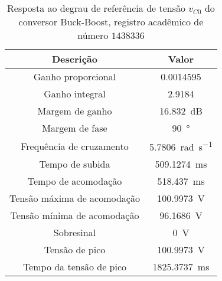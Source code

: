 \begin{table}[!ht]
\centering
\caption{Resposta ao degrau de referência de tensão $v_{C0}$ do conversor Buck-Boost, registro acadêmico de número $1438336$}
\label{tab:resposta1malha}
\begin{tabular}{@{}cc@{}}
\toprule
\textbf{Descrição} & \textbf{Valor}\\ \midrule
Ganho proporcional & \SI{0.0014595}{}\\
Ganho integral & \SI{2.9184}{}\\
Margem de ganho & \SI{16.832}{\deci\bel}\\
Margem de fase & \SI{90}{\degree}\\
Frequência de cruzamento & \SI{5.7806}{\radian\per\s}\\
Tempo de subida & \SI{509.1274}{\milli\s}\\
Tempo de acomodação & \SI{518.437}{\milli\s}\\
Tensão máxima de acomodação & \SI{100.9973}{\V}\\
Tensão mínima de acomodação & \SI{96.1686}{\V}\\
Sobresinal & \SI{0}{\V}\\
Tensão de pico & \SI{100.9973}{\V}\\
Tempo da tensão de pico & \SI{1825.3737}{\milli\s}\\
\bottomrule
\end{tabular}
\end{table}

